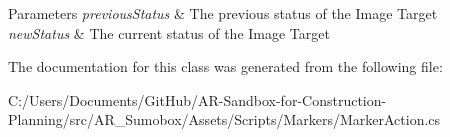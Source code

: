 \begin{DoxyParams}{Parameters}
{\em previous\+Status} & The previous status of the Image Target\\
\hline
{\em new\+Status} & The current status of the Image Target\\
\hline
\end{DoxyParams}


The documentation for this class was generated from the following file\+:\begin{DoxyCompactItemize}
\item 
C\+:/\+Users/\+Documents/\+Git\+Hub/\+A\+R-\/\+Sandbox-\/for-\/\+Construction-\/\+Planning/src/\+A\+R\+\_\+\+Sumobox/\+Assets/\+Scripts/\+Markers/Marker\+Action.\+cs\end{DoxyCompactItemize}
